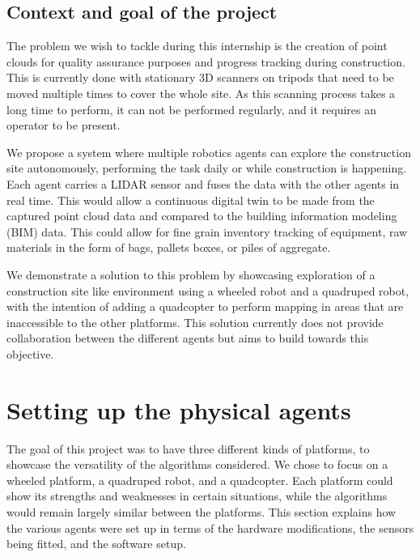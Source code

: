 \documentclass[12pt]{article}
\begin{document}
    \subsection{Context and goal of the project}   
    
    The problem we wish to tackle during this internship is the creation of point clouds for quality assurance purposes and progress tracking during construction. This is currently done with stationary 3D scanners on tripods that need to be moved multiple times to cover the whole site. As this scanning process takes a long time to perform, it can not be performed regularly, and it requires an operator to be present.
   
    We propose a system where multiple robotics agents can explore the construction site autonomously, performing the task daily or while construction is happening. Each agent carries a LIDAR sensor and fuses the data with the other agents in real time. This would allow a continuous digital twin to be made from the captured point cloud data and compared to the building information modeling (BIM) data. This could allow for fine grain inventory tracking of equipment, raw materials in the form of bags, pallets boxes, or piles of aggregate.
   
    We demonstrate a solution to this problem by showcasing exploration of a construction site like environment using a wheeled robot and a quadruped robot, with the intention of adding a quadcopter to perform mapping in areas that are inaccessible to the other platforms. This solution currently does not provide collaboration between the different agents but aims to build towards this objective. 

\newpage

\section[Setting up the physical agents]{Setting up the physical agents}
\label{section:big title}%

        The goal of this project was to have three different kinds of platforms, to showcase the versatility of the algorithms considered. We chose to focus on a wheeled platform, a quadruped robot, and a quadcopter. Each platform could show its strengths and weaknesses in certain situations, while the algorithms would remain largely similar between the platforms. This section explains how the various agents were set up in terms of the hardware modifications, the sensors being fitted, and the software setup.
\end{document}
